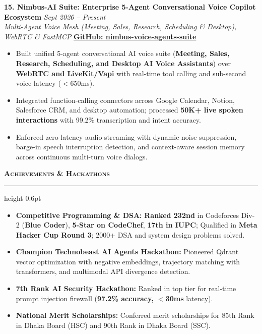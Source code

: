 \documentclass[9.5pt,a4paper]{article}
\newcommand{\resumesection}[1]{%
    \vspace{4.0pt}%
    {\color{burgundy}\scshape\bfseries\fontsize{10.0pt}{11.2pt}\selectfont #1}%
    \vspace{1.0pt}%
    \hrule height 0.6pt\relax%
    \vspace{2.5pt}%
}
\begin{document}
\vspace{2.0pt}
\noindent\textbf{15. Nimbus-AI Suite: Enterprise 5-Agent Conversational Voice Copilot Ecosystem} \hfill {\small\textit{Sept 2026 -- Present}}\\
\textit{Multi-Agent Voice Mesh (Meeting, Sales, Research, Scheduling \& Desktop), WebRTC \& FastMCP} \hfill {\footnotesize\href{https://github.com/KishorKumarParoi/nimbus-voice-agents-suite}{\textbf{GitHub: nimbus-voice-agents-suite}}}
\begin{itemize}
    \item Built unified 5-agent conversational AI voice suite (\textbf{Meeting, Sales, Research, Scheduling, and Desktop AI Voice Assistants}) over \textbf{WebRTC and LiveKit/Vapi} with real-time tool calling and sub-second voice latency ($<$650ms).
    \item Integrated function-calling connectors across Google Calendar, Notion, Salesforce CRM, and desktop automation; processed \textbf{50K+ live spoken interactions} with 99.2\% transcription and intent accuracy.
    \item Enforced zero-latency audio streaming with dynamic noise suppression, barge-in speech interruption detection, and context-aware session memory across continuous multi-turn voice dialogs.
\end{itemize}

\resumesection{Achievements \& Hackathons}
\begin{itemize}
    \item \textbf{Competitive Programming \& DSA:} \textbf{Ranked 232nd} in Codeforces Div-2 (\textbf{Blue Coder}), \textbf{5-Star on CodeChef}, \textbf{17th in IUPC}; Qualified in \textbf{Meta Hacker Cup Round 3}; 2000+ DSA and system design problems solved.
    \item \textbf{Champion \;\textbar\; Technobeast AI Agents Hackathon:} Pioneered Qdrant vector optimization with negative embeddings, trajectory matching with transformers, and multimodal API divergence detection.
    \item \textbf{7th Rank \;\textbar\; AI Security Hackathon:} Ranked in top tier for real-time prompt injection firewall (\textbf{97.2\% accuracy, $<$30ms} latency).
    \item \textbf{National Merit Scholarships:} Conferred merit scholarships for 85th Rank in Dhaka Board (HSC) and 90th Rank in Dhaka Board (SSC).
\end{itemize}
\end{document}
